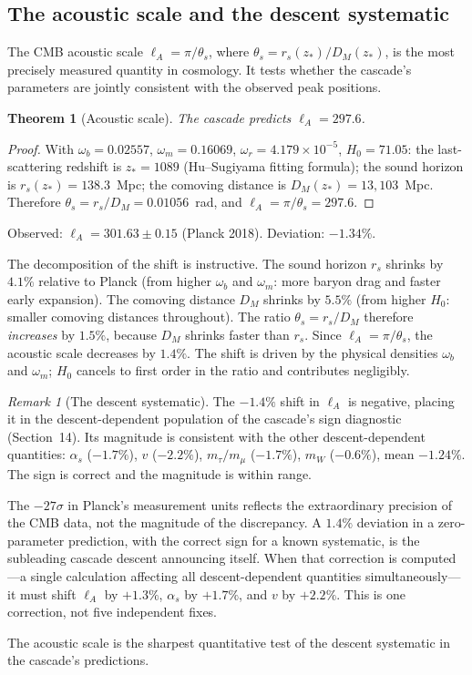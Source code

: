 \documentclass[12pt,a4paper]{article}
\newtheorem{theorem}{Theorem}[section]
\theoremstyle{remark}
\newtheorem*{remark}{Remark}
\begin{document}
\subsection{The acoustic scale and the descent systematic}

The CMB acoustic scale $\ell_A = \pi / \theta_s$, where $\theta_s = r_s(z_*) / D_M(z_*)$, is the most precisely measured quantity in cosmology. It tests whether the cascade's parameters are jointly consistent with the observed peak positions.

\begin{theorem}[Acoustic scale]\label{thm:lA}
The cascade predicts $\ell_A = 297.6$.
\end{theorem}

\begin{proof}
With $\omega_b = 0.02557$, $\omega_m = 0.16069$, $\omega_r = 4.179 \times 10^{-5}$, $H_0 = 71.05$: the last-scattering redshift is $z_* = 1089$ (Hu--Sugiyama fitting formula); the sound horizon is $r_s(z_*) = 138.3$~Mpc; the comoving distance is $D_M(z_*) = 13{,}103$~Mpc. Therefore $\theta_s = r_s/D_M = 0.01056$~rad, and $\ell_A = \pi/\theta_s = 297.6$.
\end{proof}

\noindent Observed: $\ell_A = 301.63 \pm 0.15$ (Planck 2018). Deviation: $-1.34\%$.

The decomposition of the shift is instructive. The sound horizon $r_s$ shrinks by $4.1\%$ relative to Planck (from higher $\omega_b$ and $\omega_m$: more baryon drag and faster early expansion). The comoving distance $D_M$ shrinks by $5.5\%$ (from higher $H_0$: smaller comoving distances throughout). The ratio $\theta_s = r_s/D_M$ therefore \emph{increases} by $1.5\%$, because $D_M$ shrinks faster than $r_s$. Since $\ell_A = \pi/\theta_s$, the acoustic scale decreases by $1.4\%$. The shift is driven by the physical densities $\omega_b$ and $\omega_m$; $H_0$ cancels to first order in the ratio and contributes negligibly.

\begin{remark}[The descent systematic]
The $-1.4\%$ shift in $\ell_A$ is negative, placing it in the descent-dependent population of the cascade's sign diagnostic (Section~14). Its magnitude is consistent with the other descent-dependent quantities: $\alpha_s$ ($-1.7\%$), $v$ ($-2.2\%$), $m_\tau/m_\mu$ ($-1.7\%$), $m_W$ ($-0.6\%$), mean $-1.24\%$. The sign is correct and the magnitude is within range.

The $-27\sigma$ in Planck's measurement units reflects the extraordinary precision of the CMB data, not the magnitude of the discrepancy. A $1.4\%$ deviation in a zero-parameter prediction, with the correct sign for a known systematic, is the subleading cascade descent announcing itself. When that correction is computed---a single calculation affecting all descent-dependent quantities simultaneously---it must shift $\ell_A$ by $+1.3\%$, $\alpha_s$ by $+1.7\%$, and $v$ by $+2.2\%$. This is one correction, not five independent fixes.

The acoustic scale is the sharpest quantitative test of the descent systematic in the cascade's predictions.
\end{remark}
\end{document}
